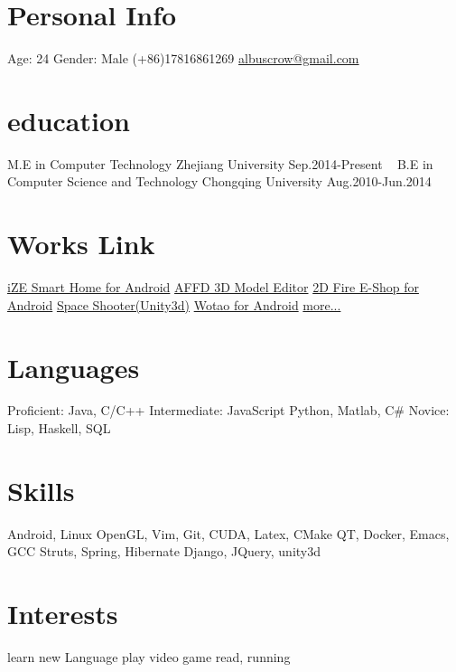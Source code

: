 \documentclass[]{friggeri-cv} %
\begin{document}


\begin{aside} %
\section{Personal Info}
Age: 24
Gender: Male
(+86)17816861269
\href{mailto:albuscrow@gmail.com}{albuscrow@gmail.com}
\section{education}
M.E in Computer Technology
Zhejiang University
Sep.2014-Present
~
B.E in Computer Science and Technology
Chongqing University
Aug.2010-Jun.2014
\section{Works Link}
\href{http://www.hisensehitachi.com/jstx/index.aspx?nodeid=1162}{iZE Smart Home for Android}
\href{https://github.com/albuscrow/AFFD}{AFFD 3D Model Editor}
\href{http://www.jinxizi.cn/android/huozhanggui.html}{2D Fire E-Shop for Android}
\href{https://github.com/albuscrow/learn_unity}{Space Shooter(Unity3d)}
\href{http://36kr.com/p/5043478.html}{Wotao for Android}
\href{https://github.com/albuscrow}{more...}
\section{Languages}
Proficient: Java, C/C++
Intermediate: JavaScript
Python, Matlab, C\#
Novice: Lisp, Haskell, SQL
\section{Skills}
\LARGE{Android}\normalsize{, }\LARGE{Linux}
\large{OpenGL}\normalsize{, }\large{Vim}\normalsize{, }\large{Git}\normalsize{, }
\normalsize{CUDA, Latex, CMake}
\normalsize{QT, Docker, Emacs, GCC}
\small{Struts}\normalsize{, }\small{Spring}\normalsize{, }\small{Hibernate}
\small{Django}\normalsize{, }\small{JQuery}\normalsize{, }\small{unity3d}
\section{Interests}
\normalsize{learn new Language
play video game
read, running}
\end{aside}
\end{document}
